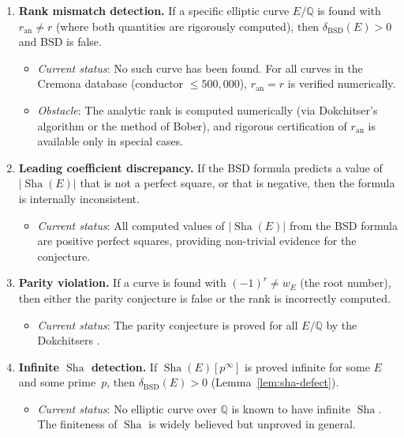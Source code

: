 \documentclass[11pt]{article}
\DeclareMathOperator{\Sha}{Sha}
\begin{document}
\begin{enumerate}
  \item \textbf{Rank mismatch detection.}  If a specific elliptic curve
    $E/\mathbb{Q}$ is found with $r_{\mathrm{an}} \neq r$ (where both
    quantities are rigorously computed), then $\delta_{\mathrm{BSD}}(E) > 0$
    and BSD is false.
    \begin{itemize}
      \item \emph{Current status}: No such curve has been found.  For all
        curves in the Cremona database \cite{Cremona} (conductor $\leq
        500{,}000$), $r_{\mathrm{an}} = r$ is verified numerically.
      \item \emph{Obstacle}: The analytic rank is computed numerically (via
        Dokchitser's algorithm or the method of Bober), and rigorous
        certification of $r_{\mathrm{an}}$ is available only in special cases.
    \end{itemize}

  \item \textbf{Leading coefficient discrepancy.}  If the BSD formula
    predicts a value of $|\Sha(E)|$ that is not a perfect square, or that
    is negative, then the formula is internally inconsistent.
    \begin{itemize}
      \item \emph{Current status}: All computed values of $|\Sha(E)|$ from the
        BSD formula are positive perfect squares, providing non-trivial
        evidence for the conjecture.
    \end{itemize}

  \item \textbf{Parity violation.}  If a curve is found with
    $(-1)^r \neq w_E$ (the root number), then either the parity conjecture
    is false or the rank is incorrectly computed.
    \begin{itemize}
      \item \emph{Current status}: The parity conjecture is proved for all
        $E/\mathbb{Q}$ by the Dokchitsers \cite{DD}.
    \end{itemize}

  \item \textbf{Infinite $\Sha$ detection.}  If $\Sha(E)[p^\infty]$ is
    proved infinite for some $E$ and some prime~$p$, then
    $\delta_{\mathrm{BSD}}(E) > 0$ (Lemma~\ref{lem:sha-defect}).
    \begin{itemize}
      \item \emph{Current status}: No elliptic curve over $\mathbb{Q}$ is
        known to have infinite $\Sha$.  The finiteness of $\Sha$ is widely
        believed but unproved in general.
    \end{itemize}


\end{enumerate}
\end{document}
